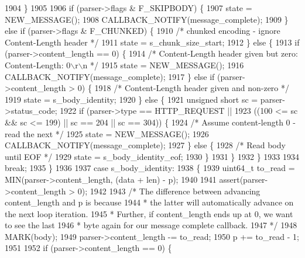 \begin{DoxyCode}
1904         \}
1905 
1906         \textcolor{keywordflow}{if} (parser->flags & F_SKIPBODY) \{
1907           state = NEW_MESSAGE();
1908           CALLBACK_NOTIFY(message\_complete);
1909         \} \textcolor{keywordflow}{else} \textcolor{keywordflow}{if} (parser->flags & F_CHUNKED) \{
1910           \textcolor{comment}{/* chunked encoding - ignore Content-Length header */}
1911           state = s_chunk_size_start;
1912         \} \textcolor{keywordflow}{else} \{
1913           \textcolor{keywordflow}{if} (parser->content_length == 0) \{
1914             \textcolor{comment}{/* Content-Length header given but zero: Content-Length: 0\(\backslash\)r\(\backslash\)n */}
1915             state = NEW_MESSAGE();
1916             CALLBACK_NOTIFY(message\_complete);
1917           \} \textcolor{keywordflow}{else} \textcolor{keywordflow}{if} (parser->content_length > 0) \{
1918             \textcolor{comment}{/* Content-Length header given and non-zero */}
1919             state = s_body_identity;
1920           \} \textcolor{keywordflow}{else} \{
1921             \textcolor{keywordtype}{unsigned} \textcolor{keywordtype}{short} sc = parser->status_code;
1922             \textcolor{keywordflow}{if} (parser->type == HTTP_REQUEST ||
1923                 ((100 <= sc && sc <= 199) || sc == 204 || sc == 304)) \{
1924               \textcolor{comment}{/* Assume content-length 0 - read the next */}
1925               state = NEW_MESSAGE();
1926               CALLBACK_NOTIFY(message\_complete);
1927             \} \textcolor{keywordflow}{else} \{
1928               \textcolor{comment}{/* Read body until EOF */}
1929               state = s_body_identity_eof;
1930             \}
1931           \}
1932         \}
1933 
1934         \textcolor{keywordflow}{break};
1935       \}
1936 
1937       \textcolor{keywordflow}{case} s_body_identity:
1938       \{
1939         uint64\_t to\_read = MIN(parser->content_length, (data + len) - p);
1940 
1941         assert(parser->content_length > 0);
1942 
1943         \textcolor{comment}{/* The difference between advancing content\_length and p is because}
1944 \textcolor{comment}{         * the latter will automatically advance on the next loop iteration.}
1945 \textcolor{comment}{         * Further, if content\_length ends up at 0, we want to see the last}
1946 \textcolor{comment}{         * byte again for our message complete callback.}
1947 \textcolor{comment}{         */}
1948         MARK(body);
1949         parser->content_length -= to\_read;
1950         p += to\_read - 1;
1951 
1952         \textcolor{keywordflow}{if} (parser->content_length == 0) \{

\end{DoxyCode}
